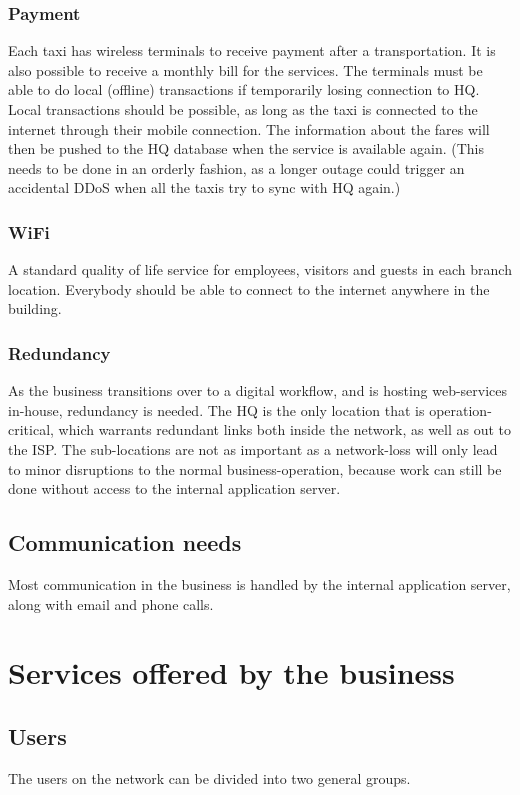 \subsubsection{Payment}
Each taxi has wireless terminals to receive payment after a transportation. It is also possible to receive a monthly bill for the services. The terminals must be able to do local (offline) transactions if temporarily losing connection to HQ.
Local transactions should be possible, as long as the taxi is connected to the internet through their mobile connection. 
The information about the fares will then be pushed to the HQ database when the service is available again. (This needs to be done in an orderly fashion, as a longer outage could trigger an accidental DDoS when all the taxis try to sync with HQ again.)

\subsubsection{WiFi}
A standard quality of life service for employees, visitors and guests in each branch location. 
Everybody should be able to connect to the internet anywhere in the building.

\subsubsection{Redundancy}
As the business transitions over to a digital workflow, and is hosting web-services in-house, redundancy is needed.
The HQ is the only location that is operation-critical, which warrants redundant links both inside the network, as well as out to the ISP. 
The sub-locations are not as important as a network-loss will only lead to minor disruptions to the normal business-operation, because work can still be done without access to the internal application server.

\subsection{Communication needs}
Most communication in the business is handled by the internal application server, along with email and phone calls.


\section{Services offered by the business}


\subsection{Users}
The users on the network can be divided into two general groups.


